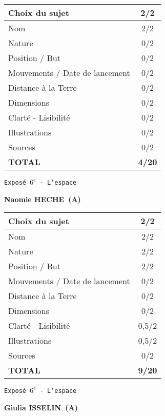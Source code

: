 	\vspace*{2cm}
	\begin{tabular}{|l|c|}
		\hline
		Choix du sujet & 2/2 \\
		\hline
		Nom & 2/2 \\
		\hline
		Nature & 0/2 \\
		\hline
		Position / But & 0/2 \\
		\hline
		Mouvements / Date de lancement & 0/2 \\
		\hline
		Distance \`a la Terre & 0/2 \\
		\hline
		Dimensions & 0/2 \\
		\hline
		Clart\'e - Lisibilit\'e & 0/2 \\
		\hline
		Illustrations & 0/2 \\
		\hline
		Sources & 0/2 \\
		\hline
		\textbf{TOTAL}  & \textbf{4/20} \\
		\hline
	\end{tabular}
	\newline
	\LARGE{\texttt{Expos\'e $6^e$ - L'espace}}
	\vspace*{1cm}

	\textbf{Naomie HECHE\ (A)}

	\vspace*{2cm}
	\begin{tabular}{|l|c|}
		\hline
		Choix du sujet & 2/2 \\
		\hline
		Nom & 2/2 \\
		\hline
		Nature & 2/2 \\
		\hline
		Position / But & 2/2 \\
		\hline
		Mouvements / Date de lancement & 0/2 \\
		\hline
		Distance \`a la Terre & 0/2 \\
		\hline
		Dimensions & 0/2 \\
		\hline
		Clart\'e - Lisibilit\'e & 0,5/2 \\
		\hline
		Illustrations & 0,5/2 \\
		\hline
		Sources & 0/2 \\
		\hline
		\textbf{TOTAL}  & \textbf{9/20} \\
		\hline
	\end{tabular}
	\newline
	\LARGE{\texttt{Expos\'e $6^e$ - L'espace}}
	\vspace*{1cm}

	\textbf{Giulia ISSELIN\ (A)}

